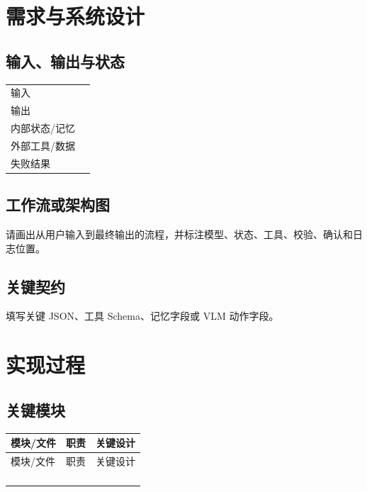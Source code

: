 \documentclass[UTF8,zihao=-4]{ctexart}
\begin{document}
\section{需求与系统设计}

\subsection{输入、输出与状态}

\begin{tabularx}{\textwidth}{L{2.6cm} Y}
\toprule
输入 & \\[1.2cm]
输出 & \\[1.2cm]
内部状态/记忆 & \\[1.2cm]
外部工具/数据 & \\[1.2cm]
失败结果 & \\[1.2cm]
\bottomrule
\end{tabularx}

\subsection{工作流或架构图}

请画出从用户输入到最终输出的流程，并标注模型、状态、工具、校验、确认和日志位置。

\vspace{7cm}

\subsection{关键契约}

填写关键 JSON、工具 Schema、记忆字段或 VLM 动作字段。

\vspace{4cm}

\section{实现过程}

\subsection{关键模块}

\begin{longtable}{L{3.1cm} L{4.0cm} L{7.7cm}}
\toprule
模块/文件 & 职责 & 关键设计\\
\midrule
\endfirsthead
\toprule
模块/文件 & 职责 & 关键设计\\
\midrule
\endhead
 & &\\[1.2cm]
 & &\\[1.2cm]
 & &\\[1.2cm]
 & &\\[1.2cm]
\bottomrule
\end{longtable}
\end{document}
